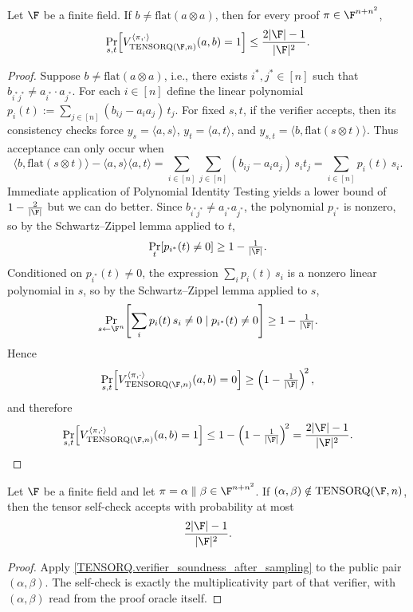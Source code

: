 \begin{lemma}\label{TENSORQ.verifier_soundness_after_sampling}\leanok
Let \(\F\) be a finite field. If \(b \neq \mathrm{flat}(a\otimes a)\), then for every proof
\(\pi\in \F^{n+n^2}\),
\[
  \Pr_{s,t}\!\left[
    V_{\mathrm{TENSORQ}(\F,n)}^{\langle\pi,\cdot\rangle}(a,b)=1
  \right]
  \leq \frac{2|\F|-1}{|\F|^2}.
\]
\end{lemma}
\begin{proof}\leanok
Suppose \(b \neq \mathrm{flat}(a \otimes a)\), i.e., there exists \(i^*, j^* \in [n]\) such that
\(b_{i^* j^*} \neq a_{i^*} \cdot a_{j^*}\).
For each \(i \in [n]\) define the linear polynomial \(p_i(t) := \sum_{j \in [n]} (b_{ij} - a_i a_j)\, t_j\).
For fixed \(s,t\), if the verifier accepts, then its consistency checks force
\(y_s=\langle a,s\rangle\), \(y_t=\langle a,t\rangle\), and
\(y_{s,t}=\langle b,\mathrm{flat}(s\otimes t)\rangle\). Thus acceptance can only occur when
\[
  \langle b, \mathrm{flat}(s \otimes t) \rangle - \langle a,s\rangle\langle a,t\rangle
  = \sum_{i \in [n]}  \sum_{j \in [n]} (b_{ij} - a_i a_j)\, s_i t_j
  = \sum_{i \in [n]} p_i(t)\, s_i.
\]
Immediate application of Polynomial Identity Testing yields a lower bound of $1 - \tfrac{2}{|\F|}$ but we can do better.
Since \(b_{i^* j^*} \neq a_{i^*} a_{j^*}\), the polynomial \(p_{i^*}\) is nonzero, so by the
Schwartz--Zippel lemma applied to \(t\),
\[
  \Pr_{t}\!\left[p_{i^*}(t) \neq 0\right] \geq 1 - \tfrac{1}{|\F|}.
\]
Conditioned on \(p_{i^*}(t) \neq 0\), the expression \(\sum_i p_i(t)\,s_i\) is a nonzero linear polynomial
in \(s\), so by the Schwartz--Zippel lemma applied to \(s\),
\[
  \Pr_{s \leftarrow \F^n}\!\left[\sum_i p_i(t)\,s_i \neq 0 \mid p_{i^*}(t) \neq 0\right]
  \geq 1 - \tfrac{1}{|\F|}.
\]
Hence
\[
  \Pr_{s,t}\!\left[ V_{\mathrm{TENSORQ}(\F,n)}^{\langle\pi,\cdot\rangle}(a,b)=0 \right]
  \geq \left(1 - \tfrac{1}{|\F|}\right)^{\!2},
\]
and therefore
\[
  \Pr_{s,t}\!\left[ V_{\mathrm{TENSORQ}(\F,n)}^{\langle\pi,\cdot\rangle}(a,b)=1 \right]
  \leq 1 - \left(1 - \tfrac{1}{|\F|}\right)^{\!2}
  = \frac{2|\F|-1}{|\F|^2}.
\]
\end{proof}

\begin{lemma}\label{TENSORQ.selfVerifier_soundness_after_sampling}\leanok
Let \(\F\) be a finite field and let \(\pi=\alpha\parallel\beta\in\F^{n+n^2}\). If
\((\alpha,\beta)\notin\mathrm{TENSORQ}(\F,n)\), then the tensor self-check accepts with probability at most
\[
  \frac{2|\F|-1}{|\F|^2}.
\]
\end{lemma}
\begin{proof}\leanok
Apply \ref{TENSORQ.verifier_soundness_after_sampling} to the public pair \((\alpha,\beta)\). The self-check is
exactly the multiplicativity part of that verifier, with \((\alpha,\beta)\) read from the proof oracle itself.
\end{proof}


